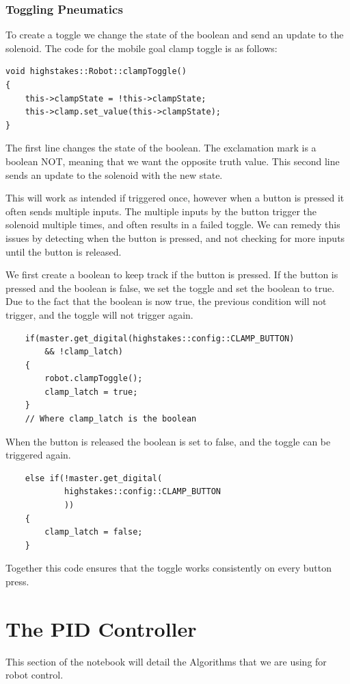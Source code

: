 \documentclass[12pt]{report}
\begin{document}
\subsection{Toggling Pneumatics}
To create a toggle we change the state of the boolean and send an update to the solenoid.
The code for the mobile goal clamp toggle is as follows:
\begin{verbatim}
void highstakes::Robot::clampToggle()
{
    this->clampState = !this->clampState;
    this->clamp.set_value(this->clampState);
}
\end{verbatim}

The first line changes the state of the boolean. 
The exclamation mark is a boolean NOT, meaning that we want the opposite truth value.
This second line sends an update to the solenoid with the new state.

This will work as intended if triggered once,
    however when a button is pressed it often sends multiple inputs.
The multiple inputs by the button trigger the solenoid multiple times,
    and often results in a failed toggle.
We can remedy this issues by detecting when the button is pressed,
    and not checking for more inputs until the button is released.

We first create a boolean to keep track if the button is pressed.
If the button is pressed and the boolean is false,
    we set the toggle and set the boolean to true.
Due to the fact that the boolean is now true, 
    the previous condition will not trigger, 
    and the toggle will not trigger again.

\begin{verbatim}
    if(master.get_digital(highstakes::config::CLAMP_BUTTON) 
        && !clamp_latch)
    {
        robot.clampToggle();
        clamp_latch = true;
    }
    // Where clamp_latch is the boolean
\end{verbatim}

When the button is released the boolean is set to false, and the toggle can be triggered again.
\begin{verbatim}
    else if(!master.get_digital(
            highstakes::config::CLAMP_BUTTON
            ))
    {
        clamp_latch = false;
    } 
\end{verbatim}

Together this code ensures that the toggle works consistently on every button press.

\chapter{The PID Controller}
This section of the notebook will detail the Algorithms that we are using for robot control.
\end{document}
